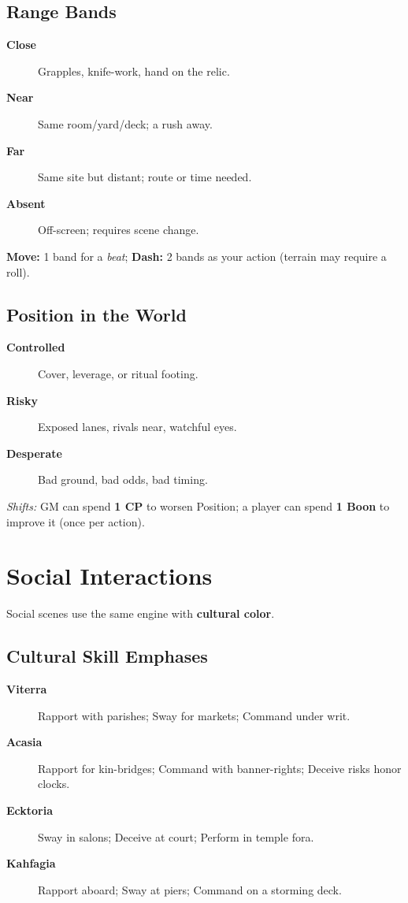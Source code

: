 \begin{multicols}{2}
\subsection*{Range Bands}
\begin{description}
  \item[\textbf{Close}] Grapples, knife-work, hand on the relic.
  \item[\textbf{Near}] Same room/yard/deck; a rush away.
  \item[\textbf{Far}] Same site but distant; route or time needed.
  \item[\textbf{Absent}] Off-screen; requires scene change.
\end{description}
\textbf{Move:} 1 band for a \emph{beat}; \textbf{Dash:} 2 bands as your action (terrain may require a roll).

\subsection*{Position in the World}
\begin{description}
  \item[\textbf{Controlled}] Cover, leverage, or ritual footing.
  \item[\textbf{Risky}] Exposed lanes, rivals near, watchful eyes.
  \item[\textbf{Desperate}] Bad ground, bad odds, bad timing.
\end{description}
\emph{Shifts:} GM can spend \textbf{1 CP} to worsen Position; a player can spend \textbf{1 Boon} to improve it (once per action).

\section{Social Interactions}
Social scenes use the same engine with \textbf{cultural color}.

\subsection*{Cultural Skill Emphases}
\begin{description}
  \item[\textbf{Viterra}]  Rapport with parishes; Sway for markets; Command under writ.
  \item[\textbf{Acasia}]  Rapport for kin-bridges; Command with banner-rights; Deceive risks honor clocks.
  \item[\textbf{Ecktoria}]  Sway in salons; Deceive at court; Perform in temple fora.
  \item[\textbf{Kahfagia}]  Rapport aboard; Sway at piers; Command on a storming deck.
\end{description}


\end{multicols}
